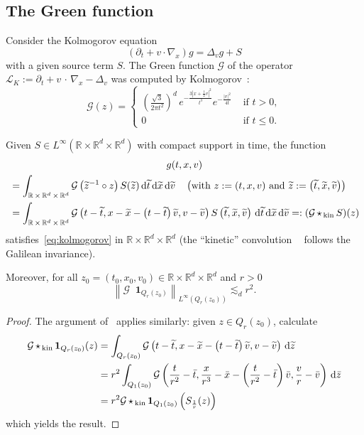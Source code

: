 \documentclass[AHL,Unicode,longabstracts,published]{cedram}
\DeclareMathOperator{\starkin}{\star_{\, kin}}
\newcommand{\R}{\mathbb{R}}
\newcommand{\cL}{\mathcal{L}}
\newcommand{\cG}{\mathcal{G}}
\newcommand*\un{\mathbf{1}}
\newcommand{\dd}{{\, \mathrm d}}
\let\oldtilde\tilde
\renewcommand*{\tilde}[1]{\mathchoice{\widetilde{#1}}{\widetilde{#1}}{\oldtilde{#1}}{\oldtilde{#1}}}
\begin{document}
\subsection{The Green function}

Consider the Kolmogorov equation
\begin{equation}\label{eq:kolmogorov}
(\partial_t + v \cdot \nabla_x) g = \Delta_v g + S
\end{equation}
with a given source term $S$. The Green function $\cG$ of the operator $\cL_K:= \partial_t + v\,\cdot\,\nabla_x - \Delta_v$ was computed by Kolmogorov~\cite{kolm}:
\begin{equation}\label{eq:green}
\cG(z) =
\begin{cases}
\left(\frac{\sqrt{3}}{2 \pi t^2}\right)^d\,e^{-\frac{3\left|x+\frac{t}2 v\right|^2}{t^3}} e^{-\frac{|v|^2}{4 t}} & \text{ if } t > 0, \\
0 & \text{ if } t \le 0.
\end{cases}
\end{equation}

\begin{prop}\label{prop:pregreen}
Given $S \in L^\infty(\R \times \R^d \times \R^d)$ with compact support in time, the function
\begin{multline*}
g(t,x,v) \\
\begin{aligned}
&= \int_{\R\,\times\,\R^d\,\times\,\R^d}
\cG\left(\tilde z^{-1} \circ z\right) S(\tilde z) \dd \tilde t \dd
\tilde x \dd \tilde v \quad
 \left(\text{with } z:=(t,x,v) \text{ and } \tilde z := \left(\tilde t,\tilde x,\tilde v\right)\right)\\
& = \int_{\R\,\times\,\R^d\,\times\,\R^d} \cG\left(t-\tilde t,x- \tilde x - \left(t - \tilde t\right)\tilde v,v-\tilde v\right) S \left(\tilde t,\tilde x,\tilde v\right) \dd \tilde t \dd \tilde x \dd \tilde v =: (\cG \starkin S)(z)
\end{aligned}
\end{multline*}
satisfies~\eqref{eq:kolmogorov} in $\R \times \R^d \times \R^d$ (the ``kinetic'' convolution $\starkin$ follows the Galilean invariance).

Moreover, for all $z_0 =(t_0,x_0,v_0) \in \R \times \R^d \times \R^d$ and $r >0$
\[
\left\|\cG \starkin \un_{Q_r(z_0)}\right\|_{L^\infty\left(Q_r(z_0)\right)}
\lesssim_d r^2.
\]
\end{prop}

\begin{proof}
The argument of~\cite[Lemma~8.4.1, p.~115]{krylov1996} applies similarly: given $z \in Q_r(z_0)$, calculate
\begin{align*}
\cG \starkin \un_{Q_r(z_0)}(z) & = \int_{Q_r(z_0)} \cG\left(t-\tilde t,x- \tilde x - \left(t - \tilde t\right)\tilde v,v-\tilde v\right) \dd \tilde z \\
& = r^2 \int_{Q_1(z_0)} \cG\left(\frac{t}{r^2}-\bar t,\frac{x}{r^3}- \bar x - \left(\frac{t}{r^2} - \bar t\right)\bar v,\frac{v}{r}-\bar v\right) \dd \bar z \\
& = r^2 \cG \starkin \un_{Q_1(z_0)}\left(S_\frac1r(z)\right)
\end{align*}
which yields the result.
\end{proof}
\end{document}
